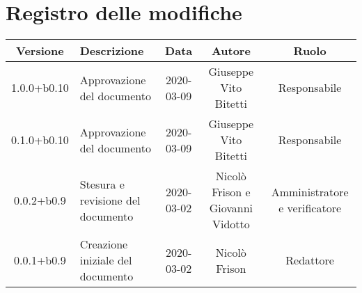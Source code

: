 \section*{Registro delle modifiche}

\begin{center}
	\begin{longtable}{|c|p{3cm}|c|c|c|}
	\hline
	\rowcolor{lighter-grayer}
	\textbf{Versione} & \textbf{Descrizione} & \textbf{Data} & \textbf{Autore} & \textbf{Ruolo} \\
	\hline
	\endfirsthead

	1.0.0+b0.10 & Approvazione del documento & 2020-03-09 & Giuseppe Vito Bitetti & Responsabile \\
	\hline
	0.1.0+b0.10 & Approvazione del documento & 2020-03-09 & Giuseppe Vito Bitetti & Responsabile \\
	\hline
	0.0.2+b0.9 & Stesura e revisione del documento & 2020-03-02 & Nicolò Frison e Giovanni Vidotto & Amministratore e verificatore \\
	\hline
	0.0.1+b0.9 & Creazione iniziale del documento & 2020-03-02 & Nicolò Frison & Redattore \\
	\hline

	\end{longtable}
\end{center}